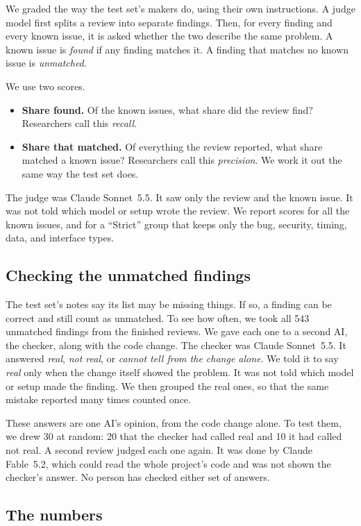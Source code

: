 \documentclass[11pt]{article}
\begin{document}
We graded the way the test set's makers do, using their own instructions. A judge model first splits a review into separate findings. Then, for every finding and every known issue, it is asked whether the two describe the same problem. A known issue is \emph{found} if any finding matches it. A finding that matches no known issue is \emph{unmatched}.

We use two scores.
\begin{itemize}
\item \textbf{Share found.} Of the known issues, what share did the review find? Researchers call this \emph{recall}.
\item \textbf{Share that matched.} Of everything the review reported, what share matched a known issue? Researchers call this \emph{precision}. We work it out the same way the test set does.
\end{itemize}

The judge was Claude Sonnet~5.5. It saw only the review and the known issue. It was not told which model or setup wrote the review. We report scores for all the known issues, and for a ``Strict'' group that keeps only the bug, security, timing, data, and interface types.

\subsection{Checking the unmatched findings}

The test set's notes say its list may be missing things. If so, a finding can be correct and still count as unmatched. To see how often, we took all 543 unmatched findings from the finished reviews. We gave each one to a second AI, the checker, along with the code change. The checker was Claude Sonnet~5.5. It answered \emph{real}, \emph{not real}, or \emph{cannot tell from the change alone}. We told it to say \emph{real} only when the change itself showed the problem. It was not told which model or setup made the finding. We then grouped the real ones, so that the same mistake reported many times counted once.

These answers are one AI's opinion, from the code change alone. To test them, we drew 30 at random: 20 that the checker had called real and 10 it had called not real. A second review judged each one again. It was done by Claude Fable~5.2, which could read the whole project's code and was not shown the checker's answer. No person has checked either set of answers.

\subsection{The numbers}
\end{document}
